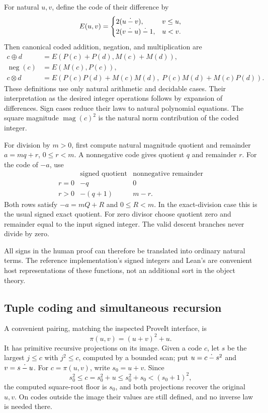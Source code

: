 For natural $u,v$, define the code of their difference by
\[
 E(u,v)=
 \begin{cases}
 2(u\mathbin{\dot{-}} v),&v\le u,\\
 2(v\mathbin{\dot{-}} u)\mathbin{\dot{-}}1,&u<v.
 \end{cases}
\]
Then canonical coded addition, negation, and multiplication are
\begin{align*}
 c\oplus d&=E(P(c)+P(d),M(c)+M(d)),\\
 \operatorname{neg}(c)&=E(M(c),P(c)),\\
 c\otimes d&=E(P(c)P(d)+M(c)M(d),\;
                 P(c)M(d)+M(c)P(d)).
\end{align*}
These definitions use only natural arithmetic and decidable cases. Their
interpretation as the desired integer operations follows by expansion of
differences. Sign cases reduce their laws to natural polynomial equations.
The square magnitude $\operatorname{mag}(c)^2$ is the natural norm
contribution of the coded integer.

For division by $m>0$, first compute natural magnitude quotient and
remainder $a=mq+r$, $0\le r<m$. A nonnegative code gives quotient $q$
and remainder $r$. For the code of $-a$, use
\[
 \begin{array}{c|cc}
 &\text{signed quotient}&\text{nonnegative remainder}\\\hline
 r=0&-q&0\\
 r>0&-(q+1)&m-r.
 \end{array}
\]
Both rows satisfy $-a=mQ+R$ and $0\le R<m$. In the exact-division case
this is the usual signed exact quotient. For zero divisor choose quotient
zero and remainder equal to the input signed integer. The valid descent
branches never divide by zero.

All signs in the human proof can therefore be translated into ordinary
natural terms. The reference implementation's signed integers and Lean's
 are convenient host representations of these functions, not
an additional sort in the object theory.

\subsection{Tuple coding and simultaneous recursion}

A convenient pairing, matching the inspected ProveIt interface, is
\[
 \pi(u,v)=(u+v)^2+u.
\]
It has primitive recursive projections on its image. Given a code $c$,
let $s$ be the largest $j\le c$ with $j^2\le c$, computed by a bounded
scan; put $u=c\mathbin{\dot{-}} s^2$ and $v=s\mathbin{\dot{-}} u$.
For $c=\pi(u,v)$, write $s_0=u+v$. Since
\[
 s_0^2\le c=s_0^2+u\le s_0^2+s_0<(s_0+1)^2,
\]
the computed square-root floor is $s_0$, and both projections recover
the original $u,v$. On codes outside the image their values are still
defined, and no inverse law is needed there.

